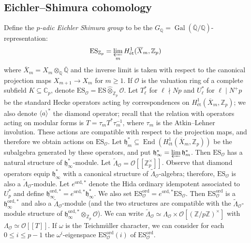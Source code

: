 \documentclass[a4paper,11pt]{amsart}
\numberwithin{equation}{section}
\theoremstyle{plain}
\theoremstyle{definition}
\theoremstyle{remark}
\newcommand{\Q}{\mathbb Q}
\newcommand{\Z}{\mathbb Z}
\newcommand{\C}{\mathbb C}
\DeclareMathOperator{\End}{End}
\DeclareMathOperator{\Gal}{Gal}
\DeclareMathOperator{\et}{\text{\'et}}
\newcommand{\ord}{\mathrm{ord}}
\newcommand{\ES}{\mathrm{ES}}
\newcommand{\invlim}{\mathop{\varprojlim}\limits}
\begin{document}
\subsection{Eichler--Shimura cohomology}
Define the \emph{$p$-adic Eichler Shimura group} to be the $G_\Q=\Gal(\overline{\Q}/\Q)$-representation:  
\[\ES_{\Z_p}=\invlim_m H^1_\text{\'et}(\overline{X}_m,\Z_p)\]
where $\overline{X}_m=X_m\otimes_\Q\overline{\Q}$ and the inverse limit is taken with respect to the canonical projection maps $X_{m+1}\rightarrow X_{m}$ for $m\geq 1$. 
If $\mathcal{O}$ is the valuation ring of a
complete subfield $K\subseteq\C_p$, denote $\mathrm{ES}_\mathcal{O}=\mathrm{ES}\widehat{\otimes}_{\Z_p}\mathcal{O}.$
Let $T_\ell^*$ for $\ell\nmid Np$ and $U_\ell^*$ for $\ell\mid N^+p$ be the standard Hecke operators 
acting by correspondences on $H^1_{\et}(\overline{X}_m,\Z_p)$; we also denote $\langle a\rangle^*$ the diamond operator; recall that 
the relation with operators acting on modular forms is $T=\tau_m T^*\tau_m^{-1}$, where $\tau_m$ is the Atkin--Lehner involution. 
These actions are compatible with respect to the projection maps, and therefore we obtain actions on $\ES_\mathcal{O}$. Let $\mathfrak{h}_m^*\subseteq \End(H^1_{\et}(\overline{X}_m,\Z_p))$ be the subalgebra generated by these operators, and put $\mathfrak{h}_\infty^*=\invlim\mathfrak{h}_m^*$. Then $\ES_\mathcal{O}$ has a natural structure of $\mathfrak{h}_\infty^*$-module. 
Let $\widetilde\Lambda_\mathcal{O}=\mathcal{O}[[\Z_p^\times]]$. Observe that diamond operators equip $\mathfrak{h}_\infty^*$ with a canonical structure of $\widetilde\Lambda_\mathcal{O}$-algebra; 
therefore, $\ES_\mathcal{O}$ is also a $\widetilde{\Lambda}_\mathcal{O}$-module. 
Let $e^{\ord,*}$ denote the Hida ordinary idempotent associated to $U_p^*$ and define $\mathfrak{h}_\infty^{\ord,*}=e^{\ord,*}\mathfrak{h}_\infty^*$. We also set 
$\ES_\mathcal{O}^\ord=e^{\ord,*}\ES_\mathcal{O}.$
Then $\ES_\mathcal{O}^\ord$ is a $\mathfrak{h}_\infty^{\ord,*}$ and also a $\widetilde{\Lambda}_\mathcal{O}$-module (and the two structures are compatible with the 
$\widetilde{\Lambda}_\mathcal{O}$-module structure of $\mathfrak{h}_\infty^{\ord,*}\otimes_{\Z_p}\mathcal{O}$). 
We can write $\widetilde{\Lambda}_\mathcal{O}\simeq \Lambda_\mathcal{O}\times \mathcal{O}[(\Z/p\Z)^\times]$ with $\Lambda_\mathcal{O}\simeq \mathcal{O}[[T]]$. 
If $\omega$ is the Teichmüller character, we can consider for each $0\le i\le p-1$ the $\omega^i$-eigenspace $\ES^\ord_\mathcal{O}(i)$ of $\ES_\mathcal{O}^\ord$. 
\end{document}
